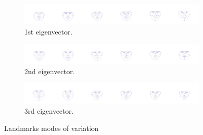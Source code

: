 \documentclass{article}
\begin{document}
\begin{figure}[H]
    \centering

    \begin{subfigure}[b]{0.8\textwidth}
        \centering
        \includegraphics[width=\linewidth]{images/mv_landmarks_eigenvector_0.jpg}
        \caption{1st eigenvector.}
        \label{fig:mv_eigenvector1_landmarks}
    \end{subfigure}


    \begin{subfigure}[b]{0.8\textwidth}
        \centering
        \includegraphics[width=\linewidth]{images/mv_landmarks_eigenvector_1.jpg}
        \caption{2nd eigenvector.}
        \label{fig:mv_eigenvector2_landmarks}
    \end{subfigure}


    \begin{subfigure}[b]{0.8\textwidth}
        \centering
        \includegraphics[width=\linewidth]{images/mv_landmarks_eigenvector_2.jpg}
        \caption{3rd eigenvector.}
        \label{fig:mv_eigenvector3_landmarks}
    \end{subfigure}

    \caption{Landmarks modes of variation}
    \label{fig:landmarks_modes_of_variation}
\end{figure}

\newpage


\end{document}
